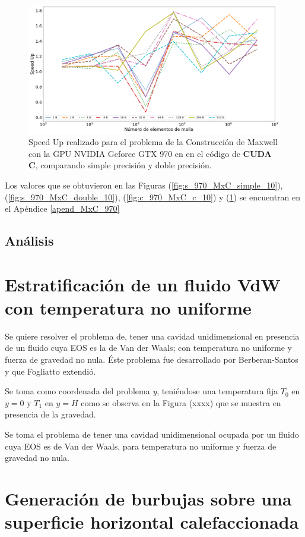 \begin{figure}[h!]
	\centering
	\includegraphics[width=\textwidth]{figs/cap4/c_970_MxC_cuda_10}
	\caption{Speed Up realizado para el problema de la Construcción de Maxwell con la GPU NVIDIA Geforce GTX 970 en en el código de \textbf{CUDA C}, comparando simple precisión y doble precisión.} 
	\label{fig:c_970_MxC_cuda_10}	
\end{figure}

Los valores que se obtuvieron en las Figuras (\ref{fig:s_970_MxC_simple_10}), (\ref{fig:s_970_MxC_double_10}), (\ref{fig:c_970_MxC_c_10}) y (\ref{fig:c_970_MxC_cuda_10}) se encuentran en el Apéndice \ref{apend_MxC_970}


\subsection{Análisis}




\section{Estratificación de un fluido VdW con temperatura no uniforme}

Se quiere resolver el problema de, tener una cavidad unidimensional en presencia de un fluido cuya EOS es la de Van der Waals; con temperatura  no uniforme y fuerza de gravedad no nula. Éste problema fue desarrollado por Berberan-Santos \cite{berberan2002liquid} y que Fogliatto \cite{fogliatto2019simulation} extendió. 

Se toma como coordenada del problema \textit{y}, teniéndose una temperatura fija $T_{0}$ en $y = 0$ y $T_{1}$ en $y = H$ como se observa en la Figura (xxxx) que se muestra en presencia de la gravedad.





Se toma el problema de tener una cavidad unidimensional ocupada por un fluido cuya EOS es de Van der Waals, para temperatura no uniforme y fuerza de gravedad no nula.



\section{Generación de burbujas sobre una superficie horizontal calefaccionada}
